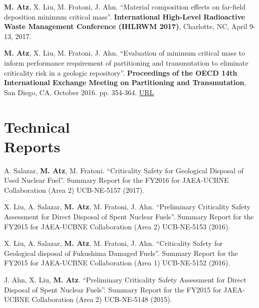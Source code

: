 \documentclass[margin,line]{resume}
\begin{document}
\begin{resume}
\begin{bibenum}
    \item \textbf{M. Atz}, X. Liu, M. Fratoni, J. Ahn. ``Material composition effects on far-field deposition minimum critical mass''. \textbf{International High-Level Radioactive Waste Management Conference (IHLRWM 2017)}, Charlotte, NC, April 9-13, 2017.

    \item \textbf{M. Atz}, X. Liu, M. Fratoni, J. Ahn. ``Evaluation of minimum critical mass to inform performance requirement of partitioning and transmutation to eliminate criticality risk in a geologic repository''. \textbf{Proceedings of the OECD 14th International Exchange Meeting on Partitioning and Transmutation}, San Diego, CA, October 2016. pp. 354-364. \href{https://www.oecd-nea.org/science/docs/2017/nsc-r2017-3.pdf}{URL} 

\end{bibenum}
\section{\mysidestyle Technical\\Reports}
\begin{bibenum}

    \item A. Salazar, \textbf{M. Atz}, M. Fratoni. ``Criticality Safety for Geological Disposal of Used Nuclear Fuel''. Summary Report for the FY2016 for JAEA-UCBNE Collaboration (Area 2) UCB-NE-5157 (2017).
    
    \item X. Liu, A. Salazar, \textbf{M. Atz}, M. Fratoni, J. Ahn. ``Preliminary Criticality Safety Assessment for Direct Disposal of Spent Nuclear
	Fuels''. Summary Report for the FY2015 for JAEA-UCBNE Collaboration (Area 2) UCB-NE-5153 (2016).
	
	\item X. Liu, A. Salazar, \textbf{M. Atz}, M. Fratoni, J. Ahn. ``Criticality Safety for Geological disposal of Fukushima Damaged Fuels''. Summary Report for the FY2015 for JAEA-UCBNE Collaboration (Area 1) UCB-NE-5152 (2016).

    \item J. Ahn, X. Liu, \textbf{M. Atz}. ``Preliminary Criticality Safety Assessment for Direct Disposal of Spent Nuclear Fuels''. Summary Report for the FY2015 for JAEA-UCBNE Collaboration (Area 2) UCB-NE-5148 (2015).

\end{bibenum}

\end{resume}
\end{document}
